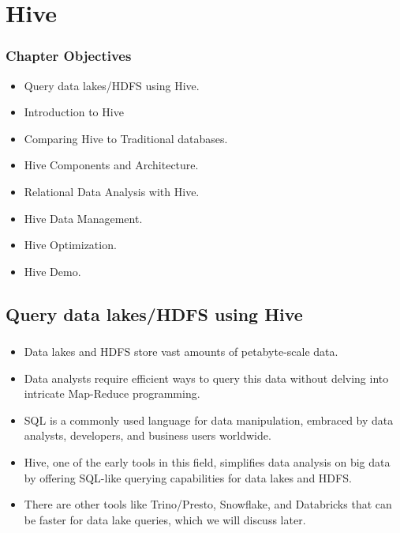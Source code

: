 \section{Hive}



\begin{frame}
\frametitle{Chapter Objectives}

\begin{itemize}
	\item<1-> Query data lakes/HDFS using Hive. \pause
	\item<2-> Introduction to Hive \pause
	\item<3-> Comparing Hive to Traditional databases.
	\item<4-> Hive Components and Architecture. \pause
	\item<5-> Relational Data Analysis with Hive. \pause
	\item<6-> Hive Data Management. \pause
	\item<7-> Hive Optimization. \pause
	\item<8-> Hive Demo. \pause
\end{itemize}

\end{frame}

\subsection{Query data lakes/HDFS using Hive}
\begin{frame}
	\frametitle{\subsecname}
	\begin{itemize} 
		\item Data lakes and HDFS store vast amounts of petabyte-scale data. \pause
		\item Data analysts require efficient ways to query this data without delving into intricate Map-Reduce programming.\pause
		\item SQL is a commonly used language for data manipulation, embraced by data analysts, developers, and business users worldwide.\pause
		\item Hive, one of the early tools in this field, simplifies data analysis on big data by offering SQL-like querying capabilities for data lakes and HDFS.\pause
		\item There are other tools like Trino/Presto, Snowflake, and Databricks that can be faster for data lake queries, which we will discuss later.\pause
	\end{itemize}
	\end{frame}

